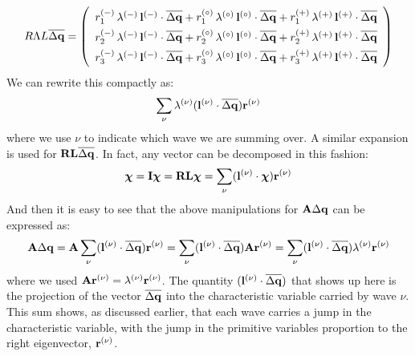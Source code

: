 \begin{equation}
\renewcommand{\arraystretch}{1.5}
R\Lambda L \overline{\Delta \qb} =
   \left ( \begin{array}{c}
            r_1^\evm \, \lambda^\evm \, \lb^\evm \cdot \overline{\Delta \qb} +
            r_1^\evz \, \lambda^\evz \, \lb^\evz \cdot \overline{\Delta \qb} +
            r_1^\evp \, \lambda^\evp \, \lb^\evp \cdot \overline{\Delta \qb} \\
%
            r_2^\evm \, \lambda^\evm \, \lb^\evm \cdot \overline{\Delta \qb} +
            r_2^\evz \, \lambda^\evz \, \lb^\evz \cdot \overline{\Delta \qb} +
            r_2^\evp \, \lambda^\evp \, \lb^\evp \cdot \overline{\Delta \qb} \\
%
            r_3^\evm \, \lambda^\evm \, \lb^\evm \cdot \overline{\Delta \qb} +
            r_3^\evz \, \lambda^\evz \, \lb^\evz \cdot \overline{\Delta \qb} +
            r_3^\evp \, \lambda^\evp \, \lb^\evp \cdot \overline{\Delta \qb} \\
   \end{array} \right )
\renewcommand{\arraystretch}{1.0}
\end{equation}
We can rewrite this compactly as:
\begin{equation}
\sum_\nu \lambda^{(\nu)} ({\bf l}^{(\nu)} \cdot \overline{\Delta {\bf q}}) {\bf r}^{(\nu)}
\end{equation}
where we use $\nu$ to indicate which wave we are summing over.  A similar
expansion is used for ${\bf R}{\bf L} \overline{\Delta {\bf q}}$.  In fact, any vector
can be decomposed in this fashion:
\begin{equation}
{\boldsymbol{\chi}} = {\bf I} {\boldsymbol{\chi}} = {\bf R} {\bf L} {\boldsymbol{\chi}} = 
   \sum_\nu ({\bf l}^{(\nu)} \cdot {\boldsymbol{\chi}}) {\bf r}^{(\nu)}
\end{equation}
And then it is easy to see that the above manipulations for ${\bf A} \Delta {\bf q}$
can be expressed as:
\begin{equation}
{\bf A} \Delta {\bf q} =  {\bf A} \sum_\nu ({\bf l}^{(\nu)} \cdot \overline{\Delta {\bf q}}) {\bf r}^{(\nu)} = 
  \sum_\nu ({\bf l}^{(\nu)} \cdot \overline{\Delta {\bf q}}) {\bf A} {\bf r}^{(\nu)} = 
  \sum_\nu ({\bf l}^{(\nu)} \cdot \overline{\Delta {\bf q}}) \lambda^{(\nu)} {\bf r}^{(\nu)}
\end{equation}
where we used ${\bf A} {\bf r}^{(\nu)} = \lambda^{(\nu)} {\bf r}^{(\nu)}$.  The quantity $({\bf l}^{(\nu)}
\cdot \overline{\Delta {\bf q}})$ that shows up here is the projection of
the vector $\overline{\Delta {\bf q}}$ into the characteristic variable
carried by wave $\nu$.  This sum shows, as discussed earlier, that each wave
carries a jump in the characteristic variable, with the jump in the primitive
variables proportion to the right eigenvector, ${\bf r}^{(\nu)}$.

